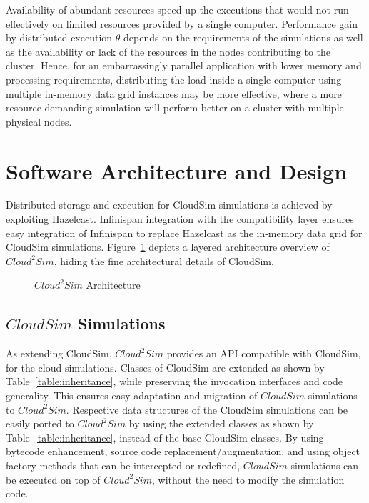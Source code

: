 Availability of abundant resources speed up the executions that would not run effectively on limited resources provided by a single computer. Performance gain by distributed execution $\theta$ depends on the requirements of the simulations as well as the availability or lack of the resources in the nodes contributing to the cluster. Hence, for an embarrassingly parallel application with lower memory and processing requirements, distributing the load inside a single computer using multiple in-memory data grid instances may be more effective, where a more resource-demanding simulation will perform better on a cluster with multiple physical nodes.

\section{Software Architecture and Design}
\label{sec:3arch}
Distributed storage and execution for CloudSim simulations is achieved by exploiting Hazelcast. Infinispan integration with the compatibility layer ensures easy integration of Infinispan to replace Hazelcast as the in-memory data grid for CloudSim simulations. Figure~\ref{fig:cloud2simArch} depicts a layered architecture overview of $Cloud^{2}Sim$, hiding the fine architectural details of CloudSim. 
\begin{figure}[!h]
\begin{center}
\end{center}

 \caption{$Cloud^{2}Sim$ Architecture}
 \label{fig:cloud2simArch}
\end{figure}

\subsection{$CloudSim$ Simulations}
As extending CloudSim, $Cloud^{2}Sim$ provides an API compatible with CloudSim, for the cloud simulations. Classes of CloudSim are extended as shown by Table~\ref{table:inheritance}, while preserving the invocation interfaces and code generality. This ensures easy adaptation and migration of $CloudSim$ simulations to $Cloud^{2}Sim$. Respective data structures of the CloudSim simulations can be easily ported to $Cloud^{2}Sim$ by using the extended classes as shown by Table~\ref{table:inheritance}, instead of the base CloudSim classes. By using bytecode enhancement, source code replacement/augmentation, and using object factory methods that can be intercepted or redefined, $CloudSim$ simulations can be executed on top of $Cloud^{2}Sim$, without the need to modify the simulation code.

